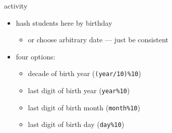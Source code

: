 \begin{frame}[fragile,label=activity]{activity}
    \lstset{language=C++}
    \begin{itemize}
    \item hash students here by birthday
        \begin{itemize}
        \item or choose arbitrary date --- just be consistent
        \end{itemize}
    \item four options:
    \begin{itemize}
    \item decade of birth year (\lstinline|(year/10)%10|)
    \item last digit of birth year (\lstinline|year%10|)
    \item last digit of birth month (\lstinline|month%10|)
    \item last digit of birth day (\lstinline|day%10|)
    \end{itemize}
    \end{itemize}
\end{frame}
